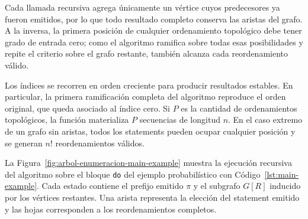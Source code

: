 Cada llamada recursiva agrega únicamente un vértice cuyos predecesores ya fueron emitidos, por lo que todo resultado completo conserva las aristas del grafo. A la inversa, la primera posición de cualquier ordenamiento topológico debe tener grado de entrada cero; como el algoritmo ramifica sobre todas esas posibilidades y repite el criterio sobre el grafo restante, también alcanza cada reordenamiento válido.

Los índices se recorren en orden creciente para producir resultados estables. En particular, la primera ramificación completa del algoritmo reproduce el orden original, que queda asociado al índice cero. Si $P$ es la cantidad de ordenamientos topológicos, la función materializa $P$ secuencias de longitud $n$. En el caso extremo de un grafo sin aristas, todos los statements pueden ocupar cualquier posición y se generan $n!$ reordenamientos válidos.

La Figura~\ref{fig:arbol-enumeracion-main-example} muestra la ejecución recursiva del algoritmo sobre el bloque \texttt{do} del ejemplo probabilístico con Código~\ref{lst:main-example}. Cada estado contiene el prefijo emitido $\pi$ y el subgrafo $G[R]$ inducido por los vértices restantes. Una arista representa la elección del statement emitido y las hojas corresponden a los reordenamientos completos.

